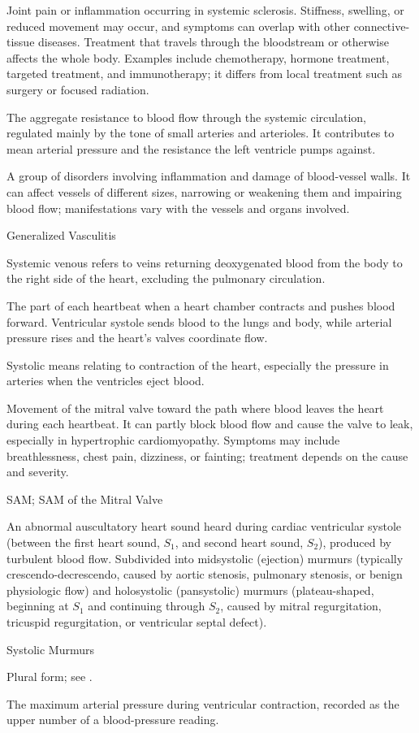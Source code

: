  Joint pain or inflammation occurring in systemic sclerosis. Stiffness, swelling, or reduced movement may occur, and symptoms can overlap with other connective-tissue diseases.
 Treatment that travels through the bloodstream or otherwise affects the whole body. Examples include chemotherapy, hormone treatment, targeted treatment, and immunotherapy; it differs from local treatment such as surgery or focused radiation.

 The aggregate resistance to blood flow through the systemic circulation, regulated mainly by the tone of small arteries and arterioles. It contributes to mean arterial pressure and the resistance the left ventricle pumps against.

 A group of disorders involving inflammation and damage of blood-vessel walls. It can affect vessels of different sizes, narrowing or weakening them and impairing blood flow; manifestations vary with the vessels and organs involved.

\synonyms
Generalized Vasculitis

 Systemic venous refers to veins returning deoxygenated blood from the body to the right side of the heart, excluding the pulmonary circulation.

 The part of each heartbeat when a heart chamber contracts and pushes blood forward. Ventricular systole sends blood to the lungs and body, while arterial pressure rises and the heart's valves coordinate flow.

 Systolic means relating to contraction of the heart, especially the pressure in arteries when the ventricles eject blood.

 Movement of the mitral valve toward the path where blood leaves the heart during each heartbeat. It can partly block blood flow and cause the valve to leak, especially in hypertrophic cardiomyopathy. Symptoms may include breathlessness, chest pain, dizziness, or fainting; treatment depends on the cause and severity.

\synonyms
SAM; SAM of the Mitral Valve

 An abnormal auscultatory heart sound heard during cardiac ventricular systole (between the first heart sound, $S_1$, and second heart sound, $S_2$), produced by turbulent blood flow. Subdivided into midsystolic (ejection) murmurs (typically crescendo-decrescendo, caused by aortic stenosis, pulmonary stenosis, or benign physiologic flow) and holosystolic (pansystolic) murmurs (plateau-shaped, beginning at $S_1$ and continuing through $S_2$, caused by mitral regurgitation, tricuspid regurgitation, or ventricular septal defect).

\synonyms
Systolic Murmurs

 Plural form; see .

 The maximum arterial pressure during ventricular contraction, recorded as the upper number of a blood-pressure reading.
